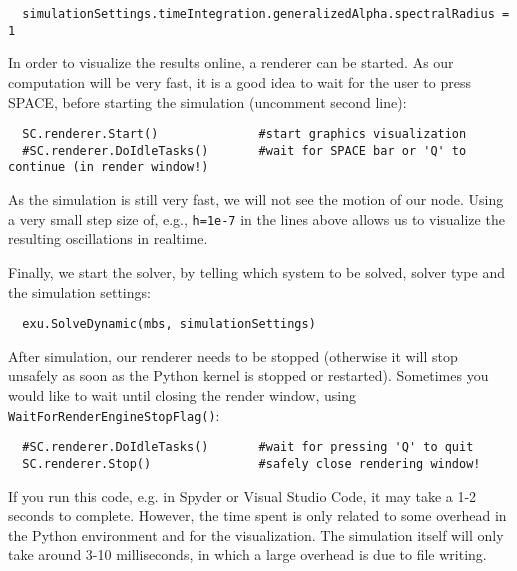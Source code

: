 \pythonstyle\begin{lstlisting}
  simulationSettings.timeIntegration.generalizedAlpha.spectralRadius = 1
\end{lstlisting}
%
In order to visualize the results online, a renderer can be started. As our computation will be very fast, it is a good idea to wait for the user to press SPACE, before starting the simulation (uncomment second line):
\pythonstyle\begin{lstlisting}
  SC.renderer.Start()              #start graphics visualization
  #SC.renderer.DoIdleTasks()       #wait for SPACE bar or 'Q' to continue (in render window!)
\end{lstlisting}
As the simulation is still very fast, we will not see the motion of our node. Using a very small step size of, e.g., \texttt{h=1e-7} in the lines above allows us to visualize the resulting oscillations in realtime.

%
Finally, we start the solver, by telling which system to be solved, solver type and the simulation settings:
\pythonstyle\begin{lstlisting}
  exu.SolveDynamic(mbs, simulationSettings)
\end{lstlisting}
%

After simulation, our renderer needs to be stopped (otherwise it will stop unsafely as soon as the Python kernel is stopped or restarted). 
Sometimes you would like to wait until closing the render window, using \texttt{WaitForRenderEngineStopFlag()}:
\pythonstyle\begin{lstlisting}
  #SC.renderer.DoIdleTasks()       #wait for pressing 'Q' to quit
  SC.renderer.Stop()               #safely close rendering window!
\end{lstlisting}
%
If you run this code, e.g. in Spyder or Visual Studio Code, it may take a 1-2 seconds to complete. However, the time spent is only related to some overhead in the Python environment and for the visualization. The simulation itself will only take around 3-10 milliseconds, in which a large overhead is due to file writing.

